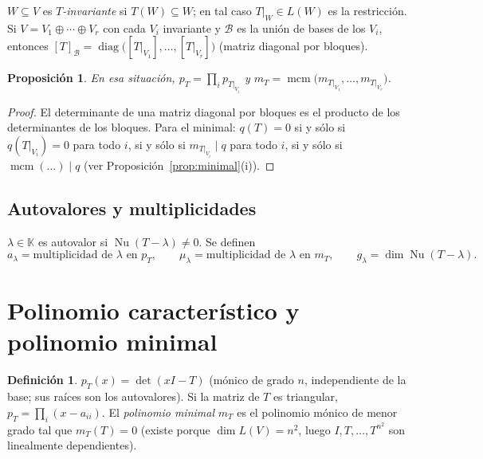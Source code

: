 \documentclass{article}
\newcommand{\K}{\mathbb{K}}
\DeclareMathOperator{\Nu}{Nu}
\DeclareMathOperator{\mcm}{mcm}
\theoremstyle{plain}
\newtheorem{proposicion}[teorema]{Proposición}
\theoremstyle{definition}
\newtheorem{definicion}[teorema]{Definición}
\theoremstyle{remark}
\begin{document}
\(W\subseteq V\) es \emph{\(T\)-invariante} si \(T(W)\subseteq W\); en tal caso \(T|_W\in L(W)\) es la restricción. Si \(V=V_1\oplus\cdots\oplus V_r\) con cada \(V_i\) invariante y \(\mathcal B\) es la unión de bases de los \(V_i\), entonces \([T]_{\mathcal B}=\operatorname{diag}\big([T|_{V_1}],\dots,[T|_{V_r}]\big)\) (matriz diagonal por bloques).

\begin{proposicion}\label{prop:bloques}
    En esa situación, \(p_T=\prod_ip_{T|_{V_i}}\) y \(m_T=\mcm\big(m_{T|_{V_1}},\dots,m_{T|_{V_r}}\big)\).
\end{proposicion}
\begin{proof}
    El determinante de una matriz diagonal por bloques es el producto de los determinantes de los bloques. Para el minimal: \(q(T)=0\) si y sólo si \(q(T|_{V_i})=0\) para todo \(i\), si y sólo si \(m_{T|_{V_i}}\mid q\) para todo \(i\), si y sólo si \(\mcm(\dots)\mid q\) (ver Proposición~\ref{prop:minimal}(i)).
\end{proof}

\subsection{Autovalores y multiplicidades}

\(\lambda\in\K\) es autovalor si \(\Nu(T-\lambda)\ne0\). Se definen
\[
    a_\lambda=\text{multiplicidad de }\lambda\text{ en }p_T,\qquad
    \mu_\lambda=\text{multiplicidad de }\lambda\text{ en }m_T,\qquad
    g_\lambda=\dim\Nu(T-\lambda).
\]

\section{Polinomio característico y polinomio minimal}

\begin{definicion}
    \(p_T(x)=\det(xI-T)\) (mónico de grado \(n\), independiente de la base; sus raíces son los autovalores). Si la matriz de \(T\) es triangular, \(p_T=\prod_i(x-a_{ii})\).
    El \emph{polinomio minimal} \(m_T\) es el polinomio mónico de menor grado tal que \(m_T(T)=0\) (existe porque \(\dim L(V)=n^2\), luego \(I,T,\dots,T^{n^2}\) son linealmente dependientes).
\end{definicion}
\end{document}
